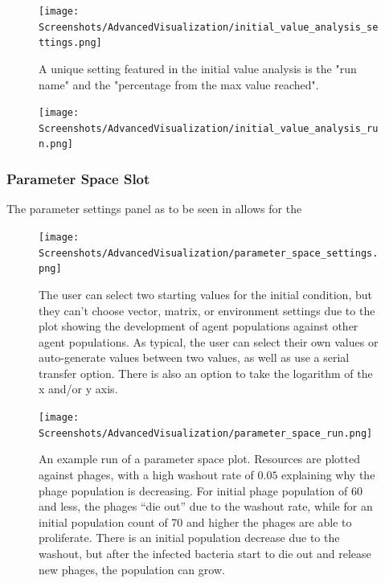 \begin{figure}
    \centering
    \texttt{[image: Screenshots/AdvancedVisualization/initial\_value\_analysis\_settings.png]}
    \caption{
        A unique setting featured in the initial value analysis is the "run name" and the "percentage from the max value reached". 
    }
    \label{fig:ss:av:initial_value_analysis_settings}
\end{figure}
\begin{figure}
    \centering
    \texttt{[image: Screenshots/AdvancedVisualization/initial\_value\_analysis\_run.png]}
    \caption{
    }
    \label{fig:ss:av:initial_value_analysis_run}
\end{figure}

\subsubsection{Parameter Space Slot}
The parameter settings panel as to be seen in  allows for the 
\begin{figure}
    \centering 
    \texttt{[image: Screenshots/AdvancedVisualization/parameter\_space\_settings.png]}
    \caption{
        The user can select two starting values for the initial condition, but they can't choose vector, matrix, or environment settings due to the plot showing the development of agent populations against other agent populations. 
        As typical, the user can select their own values or auto-generate values between two values, as well as use a serial transfer option. 
        There is also an option to take the logarithm of the x and/or y axis. 
    }
    \label{fig:ss:av:parameter_space_settings}
\end{figure}
\begin{figure}
    \centering 
    \texttt{[image: Screenshots/AdvancedVisualization/parameter\_space\_run.png]}
    \caption{
        An example run of a parameter space plot. 
        Resources are plotted against phages, with a high washout rate of $0.05$ explaining why the phage population is decreasing. 
        For initial phage population of 60 and less, the phages “die out” due to the washout rate, while for an initial population count of 70 and higher the phages are able to proliferate. 
        There is an initial population decrease due to the washout, but after the infected bacteria start to die out and release new phages, the population can grow. 
    }
    \label{fig:ss:av:parameter_space_run}
\end{figure}

